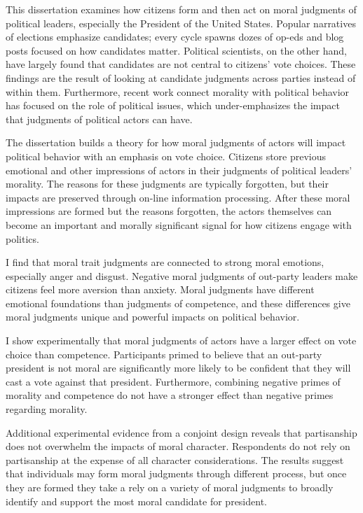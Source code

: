 This dissertation examines how citizens form and then act on moral judgments of political leaders, especially the President of the United States. Popular narratives of elections emphasize candidates; every cycle spawns dozes of op-eds and blog posts focused on how candidates matter. Political scientists, on the other hand, have largely found that candidates are not central to citizens' vote choices. These findings are the result of looking at candidate judgments across parties instead of within them. Furthermore, recent work connect morality with political behavior has focused on the role of political issues, which under-emphasizes the impact that judgments of political actors can have.

The dissertation builds a theory for how moral judgments of actors will impact political behavior with an emphasis on vote choice. Citizens store previous emotional and other impressions of actors in their judgments of political leaders' morality. The reasons for these judgments are typically forgotten, but their impacts are preserved through on-line information processing. After these moral impressions are formed but the reasons forgotten, the actors themselves can become an important and morally significant signal for how citizens engage with politics.

I find that moral trait judgments are connected to strong moral emotions, especially anger and disgust. Negative moral judgments of out-party leaders make citizens feel more aversion than anxiety. Moral judgments have different emotional foundations than judgments of competence, and these differences give moral judgments unique and powerful impacts on political behavior.

I show experimentally that moral judgments of actors have a larger effect on vote choice than competence. Participants primed to believe that an out-party president is not moral are significantly more likely to be confident that they will cast a vote against that president. Furthermore, combining negative primes of morality and competence do not have a stronger effect than negative primes regarding morality.

Additional experimental evidence from a conjoint design reveals that partisanship does not overwhelm the impacts of moral character. Respondents do not rely on partisanship at the expense of all character considerations. The results suggest that individuals may form moral judgments through different process, but once they are formed they take a rely on a variety of moral judgments to broadly identify and support the most moral candidate for president.

